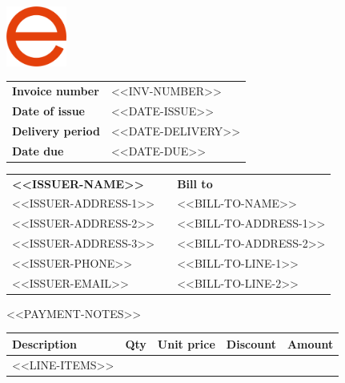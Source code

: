 \documentclass[letterpaper]{article}
\newcommand{\LARGER}{\fontsize{24}{24}\selectfont}
\begin{document}
	
\thispagestyle{empty}



\hfill{\includegraphics[height=1.98cm]{logo.png}}
\vspace{-1.98cm}

\textbf{\LARGER{Invoice}}
\vspace{20pt}

\renewcommand{\arraystretch}{1.2}

\begin{table}[h]
\begin{tabular}{@{}l l}
\textbf{Invoice number} & <<INV-NUMBER>> \\
\textbf{Date of issue}  & <<DATE-ISSUE>> \\ %
\textbf{Delivery period}& <<DATE-DELIVERY>> \\ %
\textbf{Date due}       & <<DATE-DUE>> %
\end{tabular}
\end{table}

\begin{table}[h]
\begin{tabularx}{\textwidth}{@{}l l l}
\textbf{<<ISSUER-NAME>>} && \textbf{Bill to}        \\
<<ISSUER-ADDRESS-1>>    && <<BILL-TO-NAME>>       \\
<<ISSUER-ADDRESS-2>>    && <<BILL-TO-ADDRESS-1>>  \\
<<ISSUER-ADDRESS-3>>    && <<BILL-TO-ADDRESS-2>>  \\
<<ISSUER-PHONE>>        && <<BILL-TO-LINE-1>>     \\
<<ISSUER-EMAIL>>        && <<BILL-TO-LINE-2>>
\end{tabularx}
\end{table}

\renewcommand{\arraystretch}{1.5}

\normalsize{<<PAYMENT-NOTES>>}

\begin{table}[h]
\setlength{\tabcolsep}{12pt} %
\begin{tabularx}{\textwidth}{@{}X r r r r@{}}
   \textbf{Description} & \textbf{Qty} & \textbf{Unit price} & \textbf{Discount} & \textbf{Amount} \\[0.2em]
   \hline
   <<LINE-ITEMS>>
\end{tabularx}
\end{table}
\end{document}
